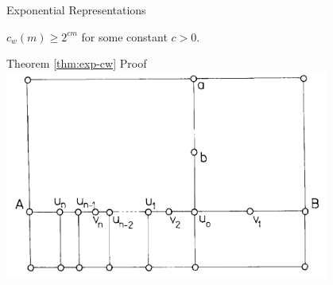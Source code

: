 \documentclass[10pt,aspectratio=169]{beamer}
\theoremstyle{plain}
\begin{document}
\begin{frame}{Exponential Representations}
    \begin{theorem}
        \(c_w(m) \geq 2^{c m}\) for some constant \(c > 0\).
        \label{thm:exp-cw}
    \end{theorem}
\end{frame}

\begin{frame}{Theorem \ref{thm:exp-cw} Proof}
    \includegraphics[width=0.8\textwidth]{images/figure-11.png}
\end{frame}
\end{document}
